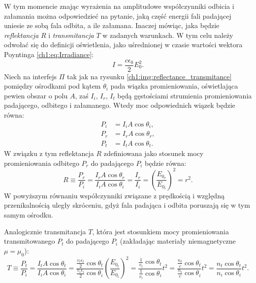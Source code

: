 
W tym momencie znając wyrażenia na amplitudowe współczynniki odbicia i załamania można odpowiedzieć na pytanie, jaką część energii fali padającej uniesie ze sobą fala odbita, a ile załamana. Inaczej mówiąc, jaka będzie \textit{reflektancja} $R$ i \textit{transmitancja} $T$ w zadanych warunkach. W tym celu należy odwołać się do definicji oświetlenia, jako uśrednionej w czasie wartości wektora Poyntinga \eqref{ch1:eq:Irradiance}:
\begin{equation}
I = \frac{c\epsilon_0}{2}E_0^2.
\end{equation}
Niech na interfejs $\Pi$ tak jak na rysunku \ref{ch1:img:reflectance_transmitance} pomiędzy ośrodkami pod kątem $\theta_i$ pada wiązka promieniowania, oświetlająca pewien obszar o polu $A$, zaś $I_i$, $I_r$, $I_t$ będą gęstościami strumienia promieniowania padającego, odbitego i załamanego.
Wtedy moc odpowiednich wiązek będzie równa:
\begin{align*}
P_i &= I_iA\cos\theta_i,\\
P_r &= I_rA\cos\theta_r,\\
P_t &= I_tA\cos\theta_t.
\end{align*}
W związku z tym reflektancja $R$ zdefiniowana jako stosunek mocy promieniowania odbitego $P_r$ do padającego $P_i$ będzie równa:
\begin{equation}
R\equiv\frac{P_r}{P_i}=\frac{I_rA\cos\theta_r}{I_iA\cos\theta_i}=\frac{I_r}{I_i} = \left( \frac{E_{0_r}}{E_{0_i}} \right)^2 = r^2.
\label{ch1:eq:Reflectance}
\end{equation}
W powyższym równaniu współczynniki związane z prędkością i względną przenikalnością uległy skróceniu, gdyż fala padająca i odbita poruszają się w tym samym ośrodku.

Analogicznie transmitancja $T$, która jest stosunkiem mocy promieniowania transmitowanego $P_t$ do padającego $P_i$ (zakładając materiały niemagnetyczne $\mu=\mu_0$):
\begin{equation}
T\equiv\frac{P_t}{P_i}=\frac{I_tA\cos\theta_t}{I_iA\cos\theta_i}=\frac{\frac{v_t\epsilon_t}{2}\cos\theta_t}{\frac{v_i\epsilon_i}{2}\cos\theta_i}\left(\frac{E_{0_t}}{E_{0_i}} \right)^2 = \frac{\frac{1}{v_t}\cos\theta_t}{\frac{1}{v_i}\cos\theta_i}t^2 = \frac{\frac{n_t}{c}\cos\theta_t}{\frac{n_i}{c}\cos\theta_i}t^2 = \frac{n_t\cos\theta_t}{n_i\cos\theta_i}t^2.
\label{ch1:eq:Transmitance}
\end{equation}


